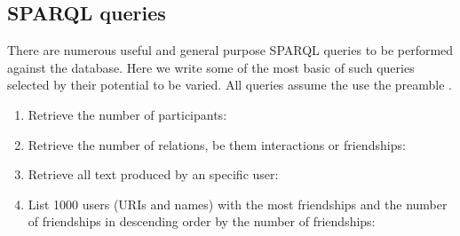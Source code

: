 	\subsection{SPARQL queries}\label{queries}
	There are numerous useful and general purpose SPARQL queries to be performed against the database.
	Here we write some of the most basic of such queries selected by their potential to be varied.
	All queries assume the use the preamble .
	\begin{enumerate}[leftmargin=0cm]
		\item Retrieve the number of participants:\\
			\item Retrieve the number of relations, be them interactions or
				friendships:\\
																														    \item Retrieve all text produced by an specific user:\\
																																				    \item List 1000 users (URIs and names) with the most friendships and the number of
																																					    friendships in descending order by the number of friendships:\\
\end{enumerate}
